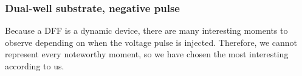 	\subsubsection{Dual-well substrate, negative pulse}
		Because a DFF is a dynamic device, there are many interesting moments to observe depending on when the voltage pulse is injected.
		Therefore, we cannot represent every noteworthy moment, so we have chosen the most interesting according to us.
		

%
%	
%

